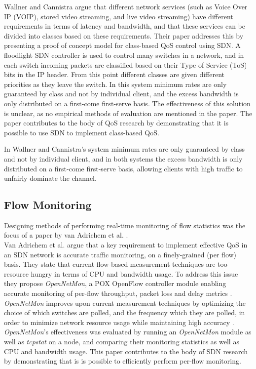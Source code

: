 \documentclass[accepted,single]{gipaper}
\begin{document}
Wallner and Cannistra \cite{Wallner:2013} argue that different network services (such as Voice Over IP (VOIP), stored video streaming, and live video streaming) have different requirements in terms of latency and bandwidth, and that these services can be divided into classes based on these requirements. Their paper addresses this by presenting a proof of concept model for class-based QoS control using SDN. A floodlight SDN controller is used to control many switches in a network, and in each switch incoming packets are classified based on their Type of Service (ToS) bits in the IP header. From this point different classes are given different priorities as they leave the switch. In this system minimum rates are only guaranteed by class and not by individual client, and the excess bandwidth is only distributed on a first-come first-serve basis. The effectiveness of this solution is unclear, as no empirical methods of evaluation are mentioned in the paper. The paper contributes to the body of QoS research by demonstrating that it is possible to use SDN to implement class-based QoS.


In Wallner and Cannistra's \cite{Wallner:2013} system minimum rates are only guaranteed by class and not by individual client, and in both systems the excess bandwidth is only distributed on a first-come first-serve basis, allowing clients with high traffic to unfairly dominate the channel.


\subsection{Flow Monitoring}
\label{flow_monitor}

Designing methods of performing real-time monitoring of flow statistics was the focus of a paper by van Adrichem et al. \cite{vanAdrichem}.
\\


Van Adrichem et al. \cite{vanAdrichem} argue that a key requirement to implement effective QoS in an SDN network is accurate traffic monitoring, on a finely-grained (per flow) basis. They state that current flow-based measurement techniques are too resource hungry in terms of CPU and bandwidth usage. To address this issue they propose \textit{OpenNetMon}, a POX OpenFlow controller module enabling accurate monitoring of per-flow throughput, packet loss and delay metrics \cite{vanAdrichem}. \textit{OpenNetMon} improves upon current measurement techniques by optimizing the choice of which switches are polled, and the frequency which they are polled, in order to minimize network resource usage while maintaining high accuracy \cite{vanAdrichem}. \textit{OpenNetMon}'s effectiveness was evaluated by running an \textit{OpenNetMon} module as well as \textit{tcpstat} on a node, and comparing their monitoring statistics as well as CPU and bandwidth usage. This paper contributes to the body of SDN research by demonstrating that is is possible to efficiently perform per-flow monitoring.
\end{document}

